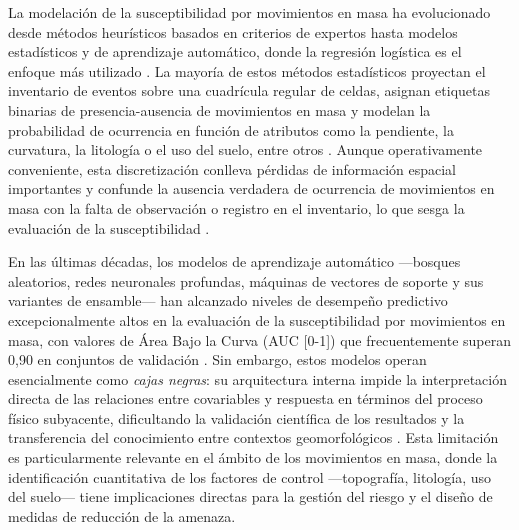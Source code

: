 \documentclass[12pt, a4paper]{article}
\begin{document}
La modelación de la susceptibilidad por movimientos en masa ha
evolucionado desde métodos heurísticos basados en criterios de expertos hasta
modelos estadísticos y de aprendizaje automático, donde la regresión logística
es el enfoque más utilizado \citep{reichenbach2018}. La mayoría de estos métodos
estadísticos proyectan el inventario de eventos sobre una cuadrícula regular de celdas, asignan
etiquetas binarias de presencia-ausencia de movimientos en masa y modelan la probabilidad de ocurrencia en
función de atributos como la pendiente, la curvatura, la litología o el
uso del suelo, entre otros \citep{guzzetti2005, lombardo2018}. Aunque operativamente conveniente,
esta discretización conlleva pérdidas de información espacial importantes y confunde
la ausencia verdadera de ocurrencia de movimientos en masa con la falta de observación o registro en el
inventario, lo que sesga la evaluación de la susceptibilidad
\citep{lombardo2018}.

En las últimas décadas, los modelos de aprendizaje automático ---bosques aleatorios, 
redes neuronales profundas, máquinas de vectores de soporte y sus variantes de 
ensamble--- han alcanzado niveles de desempeño predictivo excepcionalmente altos 
en la evaluación de la susceptibilidad por movimientos en masa, con valores de Área Bajo la Curva (AUC [0-1]) 
que frecuentemente superan 0,90 en conjuntos de validación \citep{reichenbach2018}. 
Sin embargo, estos modelos operan esencialmente como \emph{cajas negras}: 
su arquitectura interna impide la interpretación directa de las relaciones entre 
covariables y respuesta en términos del proceso físico subyacente, dificultando 
la validación científica de los resultados y la transferencia del conocimiento 
entre contextos geomorfológicos \citep{lombardo2018}. Esta limitación es 
particularmente relevante en el ámbito de los movimientos en masa, donde 
la identificación cuantitativa de los factores de control ---topografía, 
litología, uso del suelo--- tiene implicaciones directas para la gestión 
del riesgo y el diseño de medidas de reducción de la amenaza. 
\end{document}
